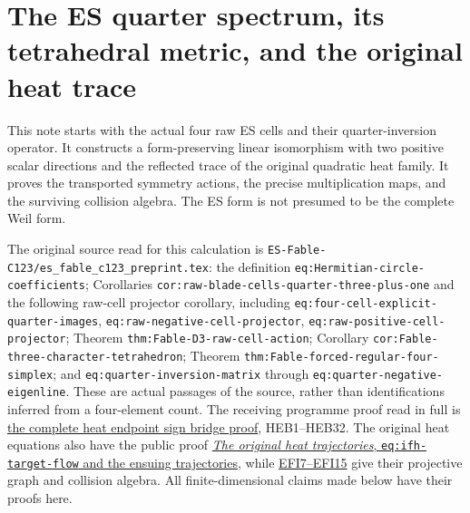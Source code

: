 \documentclass[
  10pt,
  a4paper,
]{article}
\author{}
\date{}
\begin{document}
{
\setcounter{tocdepth}{3}
\tableofcontents
}
\section{The ES quarter spectrum, its tetrahedral metric, and the
original heat
trace}\label{the-es-quarter-spectrum-its-tetrahedral-metric-and-the-original-heat-trace}

This note starts with the actual four raw ES cells and their
quarter-inversion operator. It constructs a form-preserving linear
isomorphism with two positive scalar directions and the reflected trace
of the original quadratic heat family. It proves the transported
symmetry actions, the precise multiplication maps, and the surviving
collision algebra. The ES form is not presumed to be the complete Weil
form.

The original source read for this calculation is
\texttt{ES-\allowbreak{}Fable-\allowbreak{}C123/\allowbreak{}es\_\allowbreak{}fable\_\allowbreak{}c123\_\allowbreak{}preprint.\allowbreak{}tex}: the definition
\texttt{eq:\allowbreak{}Hermitian-\allowbreak{}circle-\allowbreak{}coefficients}; Corollaries
\texttt{cor:\allowbreak{}raw-\allowbreak{}blade-\allowbreak{}cells-\allowbreak{}quarter-\allowbreak{}three-\allowbreak{}plus-\allowbreak{}one} and the following
raw-cell projector corollary, including
\texttt{eq:\allowbreak{}four-\allowbreak{}cell-\allowbreak{}explicit-\allowbreak{}quarter-\allowbreak{}images},
\texttt{eq:\allowbreak{}raw-\allowbreak{}negative-\allowbreak{}cell-\allowbreak{}projector},
\texttt{eq:\allowbreak{}raw-\allowbreak{}positive-\allowbreak{}cell-\allowbreak{}projector}; Theorem
\texttt{thm:\allowbreak{}Fable-\allowbreak{}D3-\allowbreak{}raw-\allowbreak{}cell-\allowbreak{}action}; Corollary
\texttt{cor:\allowbreak{}Fable-\allowbreak{}three-\allowbreak{}character-\allowbreak{}tetrahedron}; Theorem
\texttt{thm:\allowbreak{}Fable-\allowbreak{}forced-\allowbreak{}regular-\allowbreak{}four-\allowbreak{}simplex}; and
\texttt{eq:\allowbreak{}quarter-\allowbreak{}inversion-\allowbreak{}matrix} through
\texttt{eq:\allowbreak{}quarter-\allowbreak{}negative-\allowbreak{}eigenline}. These are actual passages of the
source, rather than identifications inferred from a four-element count.
The receiving programme proof read in full is
\href{https://github.com/KokunoYumeto/zeta-function-research-reader/blob/d5c9d198a8432e3ede468b280162a99c00e3f4f7/workbenches/splitzero-tandem/branches/tau-zero-prime-positivity/HEAT_ENDPOINT_SIGN_BRIDGE.md}{the
complete heat endpoint sign bridge proof}, HEB1--HEB32. The original
heat equations also have the public proof
\href{https://github.com/KokunoYumeto/zeta-function-research-reader/blob/ac168d55cbb400a6c8926a00d67909ba65646ac5/satellites/26_incompressible_fibre_heat.tex\#L389}{\emph{The
original heat trajectories}, \texttt{eq:\allowbreak{}ifh-\allowbreak{}target-\allowbreak{}flow} and the ensuing
trajectories}, while
\href{https://github.com/KokunoYumeto/zeta-function-research-reader/blob/173dbc6ed5a03235dbe7654f928f3692107db39b/workbenches/splitzero-tandem/branches/tau-zero-prime-positivity/ESCAPING_FIBRE_INFINITESIMAL_DERIVATION.md\#L89}{EFI7--EFI15}
give their projective graph and collision algebra. All
finite-dimensional claims made below have their proofs here.
\end{document}
